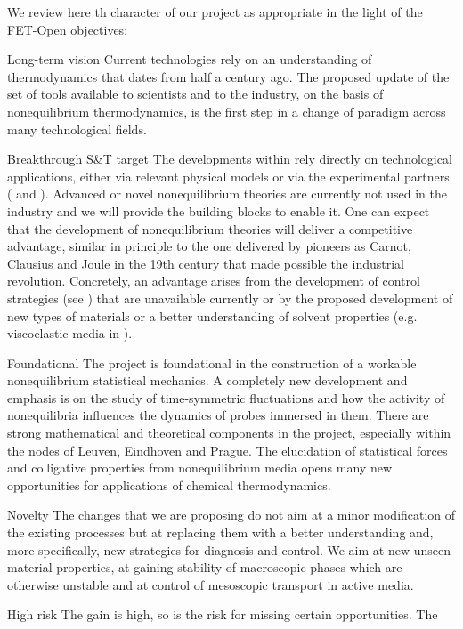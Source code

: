 We review here th character of our project \TheProject as appropriate in the light of the
FET-Open objectives:
\begin{compactdesc}
\item[Long-term vision] Current technologies rely on an understanding of thermodynamics that
dates from half a century ago. The proposed update of the set of tools available to
scientists and to the industry, on the basis of nonequilibrium thermodynamics, is the first
step in a change of paradigm across many technological fields.
\item[Breakthrough S\&T target] The developments within \TheProject rely directly on
technological applications, either via relevant physical models or via the experimental
partners ( and ). Advanced or novel nonequilibrium theories are currently not used in
the industry and we will provide the building blocks to enable it. One can expect that the
development of nonequilibrium theories will deliver a competitive advantage, similar in
principle to the one delivered by pioneers as Carnot, Clausius and Joule in the 19th century that made possible the industrial revolution.
%
Concretely, an advantage arises from the development of control strategies (see
) that are unavailable currently or by the proposed development of new types of
materials or a better understanding of solvent properties (e.g. viscoelastic media in
).
\item[Foundational] The project is foundational in the construction of a workable
nonequilibrium statistical mechanics. A completely new development and emphasis is on the
study of time-symmetric fluctuations and how the activity of nonequilibria influences the
dynamics of probes immersed in them. There are strong mathematical and theoretical
components in the project, especially within the nodes of Leuven, Eindhoven and Prague.  The
elucidation of statistical forces and colligative properties from nonequilibrium media opens
many new opportunities for applications of chemical thermodynamics.
\item[Novelty] The changes that we are proposing do not aim at a minor modification of the
existing processes but at replacing them with a better understanding and, more specifically,
new strategies for diagnosis and control.  We aim at new unseen material properties, at
gaining stability of macroscopic phases which are otherwise unstable and at control of
mesoscopic transport in active media.
\item[High risk] The gain is high, so is the risk for missing certain opportunities.  The

\end{compactdesc}
